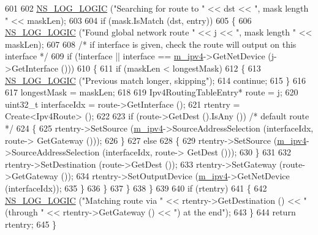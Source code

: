 \begin{DoxyCode}
601 
602           \hyperlink{group__logging_ga88acd260151caf2db9c0fc84997f45ce}{NS\_LOG\_LOGIC} (\textcolor{stringliteral}{"Searching for route to "} << dst << \textcolor{stringliteral}{", mask length "} << maskLen);
603 
604           \textcolor{keywordflow}{if} (mask.IsMatch (dst, entry))
605             \{
606               \hyperlink{group__logging_ga88acd260151caf2db9c0fc84997f45ce}{NS\_LOG\_LOGIC} (\textcolor{stringliteral}{"Found global network route "} << j << \textcolor{stringliteral}{", mask length "} << maskLen);
607 
608               \textcolor{comment}{/* if interface is given, check the route will output on this interface */}
609               \textcolor{keywordflow}{if} (!interface || interface == \hyperlink{classns3_1_1Rip_a6e2c0e74d2fa8643d223db26621dd7f1}{m\_ipv4}->GetNetDevice (j->GetInterface ()))
610                 \{
611                   \textcolor{keywordflow}{if} (maskLen < longestMask)
612                     \{
613                       \hyperlink{group__logging_ga88acd260151caf2db9c0fc84997f45ce}{NS\_LOG\_LOGIC} (\textcolor{stringliteral}{"Previous match longer, skipping"});
614                       \textcolor{keywordflow}{continue};
615                     \}
616 
617                   longestMask = maskLen;
618 
619                   Ipv4RoutingTableEntry* route = j;
620                   uint32\_t interfaceIdx = route->GetInterface ();
621                   rtentry = Create<Ipv4Route> ();
622 
623                   \textcolor{keywordflow}{if} (route->GetDest ().IsAny ()) \textcolor{comment}{/* default route */}
624                     \{
625                       rtentry->SetSource (\hyperlink{classns3_1_1Rip_a6e2c0e74d2fa8643d223db26621dd7f1}{m\_ipv4}->SourceAddressSelection (interfaceIdx, route->
      GetGateway ()));
626                     \}
627                   \textcolor{keywordflow}{else}
628                     \{
629                       rtentry->SetSource (\hyperlink{classns3_1_1Rip_a6e2c0e74d2fa8643d223db26621dd7f1}{m\_ipv4}->SourceAddressSelection (interfaceIdx, route->
      GetDest ()));
630                     \}
631 
632                   rtentry->SetDestination (route->GetDest ());
633                   rtentry->SetGateway (route->GetGateway ());
634                   rtentry->SetOutputDevice (\hyperlink{classns3_1_1Rip_a6e2c0e74d2fa8643d223db26621dd7f1}{m\_ipv4}->GetNetDevice (interfaceIdx));
635                 \}
636             \}
637         \}
638     \}
639 
640   \textcolor{keywordflow}{if} (rtentry)
641     \{
642       \hyperlink{group__logging_ga88acd260151caf2db9c0fc84997f45ce}{NS\_LOG\_LOGIC} (\textcolor{stringliteral}{"Matching route via "} << rtentry->GetDestination () << \textcolor{stringliteral}{" (through "} << 
      rtentry->GetGateway () << \textcolor{stringliteral}{") at the end"});
643     \}
644   \textcolor{keywordflow}{return} rtentry;
645 \}
\end{DoxyCode}


